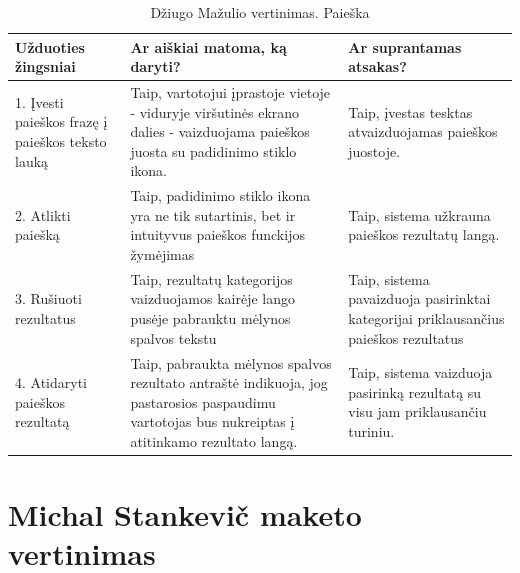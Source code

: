 \documentclass[oneside]{VUMIFPSkursinis}
\begin{document}
\begin{center}
\begin{longtable}[!htb]{|p{5cm}|p{5cm}|p{5cm}|}
	\caption{Džiugo Mažulio vertinimas. Paieška}
\endfirsthead
\endhead
	\hline
	Užduoties žingsniai & Ar aiškiai matoma, ką daryti? & Ar suprantamas atsakas? \\ \hline
	1. Įvesti paieškos frazę į paieškos teksto lauką & Taip, vartotojui įprastoje vietoje - viduryje viršutinės ekrano dalies - vaizduojama paieškos juosta su padidinimo stiklo ikona. & Taip, įvestas tesktas atvaizduojamas paieškos juostoje.   \\ \hline
	2. Atlikti paiešką & Taip, padidinimo stiklo ikona yra ne tik sutartinis, bet ir intuityvus paieškos funckijos žymėjimas & Taip, sistema užkrauna paieškos rezultatų langą. \\ \hline
	3. Rušiuoti rezultatus & Taip, rezultatų kategorijos vaizduojamos kairėje lango pusėje pabrauktu mėlynos spalvos tekstu & Taip, sistema pavaizduoja pasirinktai kategorijai priklausančius paieškos rezultatus \\ \hline
	4. Atidaryti paieškos rezultatą & Taip, pabraukta mėlynos spalvos rezultato antraštė indikuoja, jog pastarosios paspaudimu vartotojas bus nukreiptas į atitinkamo rezultato langą. & Taip, sistema vaizduoja pasirinką rezultatą su visu jam priklausančiu turiniu. \\ \hline
\end{longtable}
\end{center}

\section{Michal Stankevič maketo vertinimas}
\end{document}
